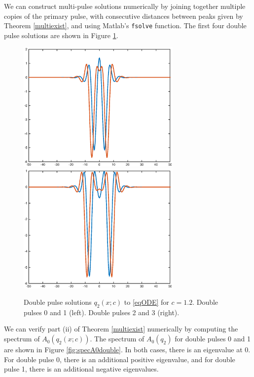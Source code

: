 \documentclass[12pt]{article}
\begin{document}
We can construct multi-pulse solutions numerically by joining together multiple copies of the primary pulse, with consecutive distances between peaks given by Theorem \ref{multiexist}, and using Matlab's \texttt{fsolve} function. The first four double pulse solutions are shown in Figure \ref{fig:double}.

\begin{figure}[H]
\label{fig:double}
\centering
\includegraphics[width=8cm]{double12_12.eps}
\includegraphics[width=8cm]{double12_34.eps}
\caption{Double pulse solutions $q_2(x; c)$ to \eqref{eqODE} for $c = 1.2$. Double pulses 0 and 1 (left). Double pulses 2 and 3 (right).}
\end{figure}

We can verify part (ii) of Theorem \ref{multiexist} numerically by computing the spectrum of $A_0(q_2(x; c))$. The spectrum of $A_0(q_2)$ for double pulses 0 and 1 are shown in Figure \ref{fig:specA0double}. In both cases, there is an eigenvalue at 0. For double pulse 0, there is an additional positive eigenvalue, and for double pulse 1, there is an additional negative eigenvalues.
\end{document}
